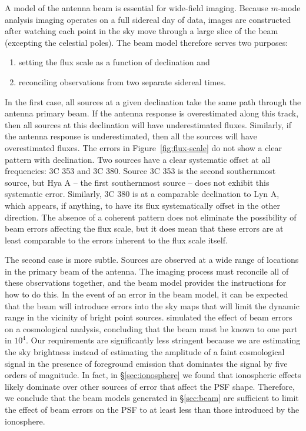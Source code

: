\begin{bibunit}
A model of the antenna beam is essential for wide-field imaging. Because $m$-mode analysis imaging
operates on a full sidereal day of data, images are constructed after watching each point in the sky
move through a large slice of the beam (excepting the celestial poles). The beam model therefore
serves two purposes:
\begin{enumerate}
    \item setting the flux scale as a function of declination and
    \item reconciling observations from two separate sidereal times.
\end{enumerate}

In the first case, all sources at a given declination take the same path through the antenna primary
beam. If the antenna response is overestimated along this track, then all sources at this
declination will have underestimated fluxes. Similarly, if the antenna response is underestimated,
then all the sources will have overestimated fluxes. The errors in Figure~\ref{fig:flux-scale} do
not show a clear pattern with declination. Two sources have a clear systematic offset at all
frequencies: 3C 353 and 3C 380. Source 3C 353 is the second southernmost source, but Hya A -- the
first southernmost source -- does not exhibit this systematic error. Similarly, 3C 380 is at a
comparable declination to Lyn A, which appears, if anything, to have its flux systematically offset
in the other direction. The absence of a coherent pattern does not eliminate the possibility of beam
errors affecting the flux scale, but it does mean that these errors are at least comparable to the
errors inherent to the flux scale itself.

The second case is more subtle. Sources are observed at a wide range of locations in the primary
beam of the antenna. The imaging process must reconcile all of these observations together, and the
beam model provides the instructions for how to do this. In the event of an error in the beam model,
it can be expected that the beam will introduce errors into the sky maps that will limit the dynamic
range in the vicinity of bright point sources.  \citet{2015PhRvD..91h3514S} simulated the effect of
beam errors on a cosmological analysis, concluding that the beam must be known to one part in $10^4$.
Our requirements are significantly less stringent because we are estimating the sky brightness
instead of estimating the amplitude of a faint cosmological signal in the presence of foreground
emission that dominates the signal by five orders of magnitude. In fact, in \S\ref{sec:ionosphere}
we found that ionospheric effects likely dominate over other sources of error that affect the PSF
shape. Therefore, we conclude that the beam models generated in \S\ref{sec:beam} are sufficient to
limit the effect of beam errors on the PSF to at least less than those introduced by the ionosphere.


\end{bibunit}
